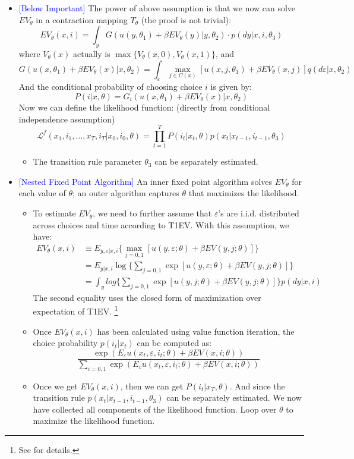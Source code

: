 \documentclass{book}
\theoremstyle{plain}
\theoremstyle{definition}
\begin{document}
\begin{itemize}
	\item \textcolor{blue}{[Below Important]}
	The power of above assumption is that we now can solve $EV_\theta$ in a contraction mapping $T_\theta$
	(the proof is not trivial):
	\[EV_\theta(x,i)=\int_y G(u(y,\theta_1)+\beta EV_\theta(y)|y,\theta_2)\cdot p(dy|x,i,\theta_3)\]
	where $V_\theta(x)$ actually is $\max\{V_\theta(x,0),V_\theta(x,1)\}$, and
	\[G(u(x,\theta_1)+\beta EV_\theta(x)|x,\theta_2)
	= \int_\varepsilon \max_{j \in C(x)}
	[u(x,j,\theta_1)+\beta EV_\theta(x,j)]
	q(d \varepsilon|x,\theta_2)\]
	And the conditional probability of choosing choice $i$ is given by:
	\[P(i|x,\theta)=G_i(u(x,\theta_1)+\beta EV_\theta(x)|x,\theta_2)\]
	Now we can define the likelihood function: (directly from conditional independence assumption)
	\[\mathcal{L}^f(x_1,i_1,\dots,x_T,i_T|x_0,i_0,\theta)=
	\prod_{t=1}^{T}P(i_t|x_t,\theta)p(x_t|x_{t-1},i_{t-1},\theta_3)\]
	\begin{itemize}
		\item The transition rule parameter $\theta_3$ can be separately estimated. 
	\end{itemize}

	\item \textcolor{blue}{[Nested Fixed Point Algorithm]}
	An inner fixed point algorithm solves $EV_\theta$ for each value of $\theta$; 
	an outer algorithm captures $\theta$ that maximizes the likelihood.
	\begin{itemize}
		\item To estimate $EV_\theta$, we need to further assume that $\varepsilon$'s are i.i.d. distributed across choices and time according to T1EV.
		With this assumption, we have:
		\begin{align*}
		EV_\theta(x,i)& \equiv E_{y,\varepsilon|x,i}
		\Big\{\max_{j=0,1}[u(y,\varepsilon;\theta)+\beta EV(y,j;\theta)]
		\Big\} \\
		&=E_{y|x,i}\log \Big\{
		\sum_{j=0,1} \exp[u(y,\varepsilon;\theta)+\beta EV(y,j;\theta)]
		\Big\}\\
		&= \int_y log \Big\{
		\sum_{j=0,1}\exp[u(y,j;\theta)+\beta EV(y,j;\theta)]
		\Big\}p(dy|x,i)
	\end{align*}
	The second equality uses the closed form of maximization over expectation of T1EV.
	\footnote{See \cite*{Chiong:2016ga} for details.}

	\item Once $EV_\theta(x,i)$ has been calculated using value function iteration, the choice probability $p(i_t|x_t)$ can be computed as:
	\[\frac{\exp(E_\varepsilon u(x_t,\varepsilon, i_t;\theta)+
	\beta EV(x,i;\theta))}
	{\sum_{i=0,1}\exp(E_\varepsilon u(x_t,\varepsilon, i_t;\theta)+
	\beta EV(x,i;\theta))}\]

	\item Once we get $EV_\theta(x,i)$, then we can get $P(i_t|x_T,\theta)$. And since the transition rule $p(x_t|x_{t-1},i_{t-1},\theta_3)$ can be separately estimated. We now have collected all components of the likelihood function. Loop over $\theta$ to maximize the likelihood function.
	\end{itemize}
\end{itemize}
\end{document}
